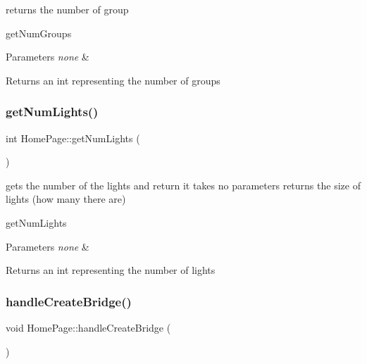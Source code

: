 returns the number of group 

get\+Num\+Groups 
\begin{DoxyParams}{Parameters}
{\em none} & \\
\hline
\end{DoxyParams}
\begin{DoxyReturn}{Returns}
an int representing the number of groups 
\end{DoxyReturn}
\mbox{\label{class_home_page_a82c2d28ad829b6c8527cec5cefae0104}} 
\subsubsection{\texorpdfstring{get\+Num\+Lights()}{getNumLights()}}
{\footnotesize\ttfamily int Home\+Page\+::get\+Num\+Lights (\begin{DoxyParamCaption}{ }\end{DoxyParamCaption})}



gets the number of the lights and return it takes no parameters returns the size of lights (how many there are) 

get\+Num\+Lights 
\begin{DoxyParams}{Parameters}
{\em none} & \\
\hline
\end{DoxyParams}
\begin{DoxyReturn}{Returns}
an int representing the number of lights 
\end{DoxyReturn}
\mbox{\label{class_home_page_aca01e2e44b307cb44aa0f23ab5d5b25b}} 
\subsubsection{\texorpdfstring{handle\+Create\+Bridge()}{handleCreateBridge()}}
{\footnotesize\ttfamily void Home\+Page\+::handle\+Create\+Bridge (\begin{DoxyParamCaption}{ }\end{DoxyParamCaption})\hspace{0.3cm}{\ttfamily [private]}}



